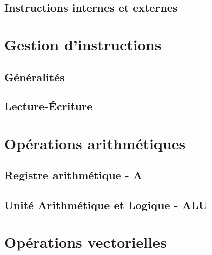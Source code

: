 \documentclass{scrreprt}
\begin{document}
	\section{Instructions internes et externes}
	
	\chapter{Gestion d'instructions}
	
	\section{Généralités}
	
	\section{Lecture-Écriture}
	
	
	
	\chapter{Opérations arithmétiques}	
	
	\section{Registre arithmétique - A}
	
	\section{Unité Arithmétique et Logique - ALU}
	
	\chapter{Opérations vectorielles}
	
\end{document}
